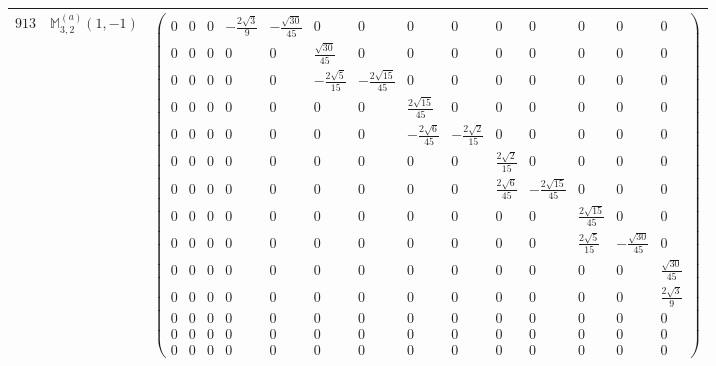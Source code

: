 \documentclass[fleqn,8pt,landscape]{jsarticle}
\begin{document}
\begin{center}
\begin{longtable}{ccc}
$ 913 $ & $ \mathbb{M}_{3,2}^{(a)}(1,-1) $ & $ \begin{pmatrix} 0 & 0 & 0 & - \frac{2 \sqrt{3}}{9} & - \frac{\sqrt{30}}{45} & 0 & 0 & 0 & 0 & 0 & 0 & 0 & 0 & 0 \\ 0 & 0 & 0 & 0 & 0 & \frac{\sqrt{30}}{45} & 0 & 0 & 0 & 0 & 0 & 0 & 0 & 0 \\ 0 & 0 & 0 & 0 & 0 & - \frac{2 \sqrt{5}}{15} & - \frac{2 \sqrt{15}}{45} & 0 & 0 & 0 & 0 & 0 & 0 & 0 \\ 0 & 0 & 0 & 0 & 0 & 0 & 0 & \frac{2 \sqrt{15}}{45} & 0 & 0 & 0 & 0 & 0 & 0 \\ 0 & 0 & 0 & 0 & 0 & 0 & 0 & - \frac{2 \sqrt{6}}{45} & - \frac{2 \sqrt{2}}{15} & 0 & 0 & 0 & 0 & 0 \\ 0 & 0 & 0 & 0 & 0 & 0 & 0 & 0 & 0 & \frac{2 \sqrt{2}}{15} & 0 & 0 & 0 & 0 \\ 0 & 0 & 0 & 0 & 0 & 0 & 0 & 0 & 0 & \frac{2 \sqrt{6}}{45} & - \frac{2 \sqrt{15}}{45} & 0 & 0 & 0 \\ 0 & 0 & 0 & 0 & 0 & 0 & 0 & 0 & 0 & 0 & 0 & \frac{2 \sqrt{15}}{45} & 0 & 0 \\ 0 & 0 & 0 & 0 & 0 & 0 & 0 & 0 & 0 & 0 & 0 & \frac{2 \sqrt{5}}{15} & - \frac{\sqrt{30}}{45} & 0 \\ 0 & 0 & 0 & 0 & 0 & 0 & 0 & 0 & 0 & 0 & 0 & 0 & 0 & \frac{\sqrt{30}}{45} \\ 0 & 0 & 0 & 0 & 0 & 0 & 0 & 0 & 0 & 0 & 0 & 0 & 0 & \frac{2 \sqrt{3}}{9} \\ 0 & 0 & 0 & 0 & 0 & 0 & 0 & 0 & 0 & 0 & 0 & 0 & 0 & 0 \\ 0 & 0 & 0 & 0 & 0 & 0 & 0 & 0 & 0 & 0 & 0 & 0 & 0 & 0 \\ 0 & 0 & 0 & 0 & 0 & 0 & 0 & 0 & 0 & 0 & 0 & 0 & 0 & 0 \end{pmatrix} $ \\ \hline

\end{longtable}
\end{center}
\end{document}
